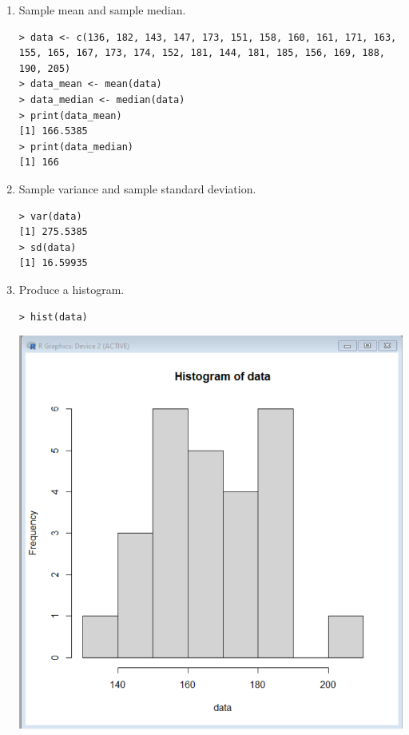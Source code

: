 \documentclass[12pt]{book}
\begin{document}
\begin{enumerate}
    \begin{enumerate}
        \item Sample mean and sample median.
        
        \begin{verbatim}
> data <- c(136, 182, 143, 147, 173, 151, 158, 160, 161, 171, 163, 155, 165, 167, 173, 174, 152, 181, 144, 181, 185, 156, 169, 188, 190, 205)
> data_mean <- mean(data)
> data_median <- median(data)
> print(data_mean)
[1] 166.5385
> print(data_median)
[1] 166
        \end{verbatim}
        
        \item Sample variance and sample standard deviation.
        
        \begin{verbatim}
> var(data)
[1] 275.5385
> sd(data)
[1] 16.59935
        \end{verbatim}
        
        \item Produce a histogram.
        \begin{verbatim}
> hist(data)
        \end{verbatim}
        \includegraphics[scale=0.8]{q5_hist.png}
        

\end{enumerate}
\end{enumerate}
\end{document}

